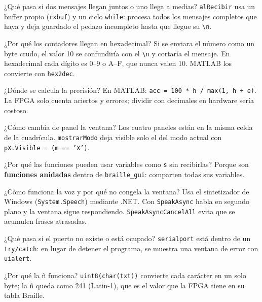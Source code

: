 \documentclass[11pt,a4paper]{article}
\newcommand{\cod}[1]{\texttt{#1}}
\begin{document}
\begin{pregunta}{¿Qué pasa si dos mensajes llegan juntos o uno llega a medias?}
\cod{alRecibir} usa un buffer propio (\cod{rxbuf}) y un ciclo \cod{while}: procesa
todos los mensajes completos que haya y deja guardado el pedazo incompleto hasta
que llegue su \cod{\textbackslash n}.
\end{pregunta}

\begin{pregunta}{¿Por qué los contadores llegan en hexadecimal?}
Si se enviara el número como un byte crudo, el valor 10 se confundiría con el
\cod{\textbackslash n} y cortaría el mensaje. En hexadecimal cada dígito es 0--9 o
A--F, que nunca valen 10. MATLAB los convierte con \cod{hex2dec}.
\end{pregunta}

\begin{pregunta}{¿Dónde se calcula la precisión?}
En MATLAB: \cod{acc = 100 * h / max(1, h + e)}. La FPGA solo cuenta aciertos y
errores; dividir con decimales en hardware sería costoso.
\end{pregunta}

\begin{pregunta}{¿Cómo cambia de panel la ventana?}
Los cuatro paneles están en la misma celda de la cuadrícula. \cod{mostrarModo}
deja visible solo el del modo actual con \cod{pX.Visible = (m == 'X')}.
\end{pregunta}

\begin{pregunta}{¿Por qué las funciones pueden usar variables como \texttt{s} sin recibirlas?}
Porque son \textbf{funciones anidadas} dentro de \cod{braille\_gui}: comparten
todas sus variables.
\end{pregunta}

\begin{pregunta}{¿Cómo funciona la voz y por qué no congela la ventana?}
Usa el sintetizador de Windows (\cod{System.Speech}) mediante .NET. Con
\cod{SpeakAsync} habla en segundo plano y la ventana sigue respondiendo.
\cod{SpeakAsyncCancelAll} evita que se acumulen frases atrasadas.
\end{pregunta}

\begin{pregunta}{¿Qué pasa si el puerto no existe o está ocupado?}
\cod{serialport} está dentro de un \cod{try/catch}: en lugar de detener el
programa, se muestra una ventana de error con \cod{uialert}.
\end{pregunta}

\begin{pregunta}{¿Por qué la ñ funciona?}
\cod{uint8(char(txt))} convierte cada carácter en un solo byte; la ñ queda como 241
(Latin-1), que es el valor que la FPGA tiene en su tabla Braille.
\end{pregunta}
\end{document}
